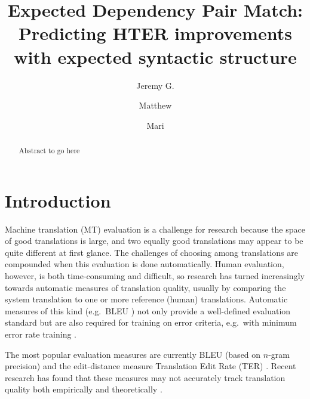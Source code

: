\documentclass{kluwer}    %
\begin{document}
\begin{article}
\begin{opening}         
\title{Expected Dependency Pair Match:\\
Predicting {HTER} improvements with expected syntactic structure} 
\author{Jeremy G. }  
\author{Matthew }
\author{Mari }  

\begin{abstract}
Abstract to go here
\end{abstract}

\end{opening}           

\normalem
\section{Introduction}
\label{sec:intro}

Machine translation (MT) evaluation is a challenge for research
because the space of good translations is large, and two equally good
translations may appear to be quite different at first glance. 
%
The challenges of choosing among translations are compounded when this
evaluation is done automatically.
%
Human evaluation, however, is both time-consuming and difficult, so
research has turned increasingly towards automatic measures of
translation quality, usually by comparing the system translation to
one or more reference (human) translations.
%
Automatic measures of this kind (e.g.\ BLEU \cite{papineni02bleu}) not
only provide a well-defined evaluation standard but are also required
for training on error criteria, e.g.\ with minimum error rate training
\cite{och03mert}.

The most popular evaluation measures are currently BLEU (based on
$n$-gram precision) and the edit-distance measure Translation Edit
Rate (TER) \cite{snover06ter}.  Recent research has found that these
measures may not accurately track translation quality both empirically
\cite{charniak03syntaxlmmt} and theoretically
\cite{callisonburch06bleuproblems}.


\end{article}
\end{document}

